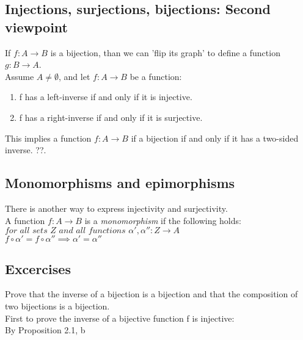 \subsection{Injections, surjections, bijections: Second viewpoint}
If $f : A \to B$ is a bijection, than we can 'flip its graph' to define a function $g : B \to A$.
\\
Assume $A \neq \emptyset$, and let $f: A \to B$ be a function:
\begin{enumerate}
  \item f has a left-inverse if and only if it is injective.
  \item f has a right-inverse if and only if it is surjective.
\end{enumerate}
This implies a function $f : A \to B$ if a bijection if and only if it has a two-sided inverse. ??.
\subsection{Monomorphisms and epimorphisms}
There is another way to express injectivity and surjectivity.
\\
A function $f: A \to B$ is a \textit{monomorphism} if the following holds:
\\
$\textit{for all sets Z and all functions } \alpha', \alpha'' : Z \to A$
\\
$f \circ \alpha' = f \circ \alpha'' \implies \alpha' = \alpha''$


\subsection{Excercises}
\begin{excercise}
  Prove that the inverse of a bijection is a bijection and that the composition of two bijections is a bijection.
  \\
  First to prove the inverse of a bijective function f is injective:
  \\
  By Proposition 2.1, b
\end{excercise}